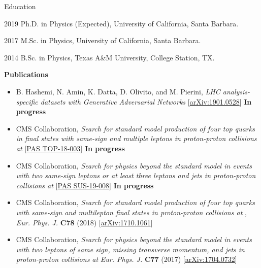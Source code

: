 \begin{vitae}

\begin{vitaesection}{Education}
\vspace{-0.1cm}
\item [2019] Ph.D. in Physics (Expected), University of California, Santa Barbara.
\item [2017] M.Sc. in Physics, University of California, Santa Barbara.
\item [2014] B.Sc. in Physics, Texas A\&M University, College Station, TX.
\end{vitaesection}

\textbf{Publications}



    \begin{itemize}
        \item B. Hashemi, N. Amin, K. Datta, D. Olivito, and M. Pierini, \textit{LHC analysis-specific datasets with Generative Adversarial Networks} [\href{https://arxiv.org/abs/1901.05282}{arXiv:1901.0528}] \textbf{In progress}
        \item CMS Collaboration, \textit{Search for standard model production of four top quarks in final states with same-sign and multiple leptons in proton-proton collisions at \sthirteen} 
            [\href{http://inspirehep.net/record/1726177}{PAS TOP-18-003}] \textbf{In progress}
        \item CMS Collaboration, \textit{Search for physics beyond the standard model in events with two same-sign leptons or at least three leptons and jets in proton-proton collisions at \sthirteen} 
            [\href{http://inspirehep.net/record/1726691}{PAS SUS-19-008}] \textbf{In progress}
        \item CMS Collaboration, \textit{Search for standard model production of four top quarks with same-sign and multilepton final states in proton-proton collisions at \sthirteen},
            \textit{Eur. Phys. J.} \textbf{C78} (2018) 
            [\href{https://arxiv.org/abs/1710.1061}{arXiv:1710.1061}]
        \item CMS Collaboration, \textit{Search for physics beyond the standard model in events with two leptons of same sign, missing transverse momentum, and jets in proton-proton collisions at \sthirteen}
            \textit{Eur. Phys. J.} \textbf{C77} (2017) 
            [\href{https://arxiv.org/abs/1704.0732}{arXiv:1704.0732}]
    \end{itemize}

\end{vitae}

